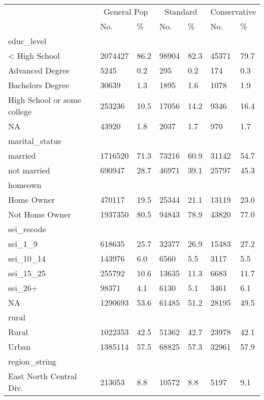 \captionsetup[table]{labelformat=empty,skip=1pt}
\begin{longtable}{lllllll}
\toprule
 & \multicolumn{2}{c}{General Pop} & \multicolumn{2}{c}{Standard} & \multicolumn{2}{c}{Conservative} \\ 
 \cmidrule(lr){2-3} \cmidrule(lr){4-5} \cmidrule(lr){6-7}
 & No. & \% & No. & \% & No. & \% \\ 
\midrule
\multicolumn{1}{l}{educ\_level} \\ 
\midrule
< High School & 2074427 & 86.2 & 98904 & 82.3 & 45371 & 79.7 \\ 
Advanced Degree & 5245 & 0.2 & 295 & 0.2 & 174 & 0.3 \\ 
Bachelors Degree & 30639 & 1.3 & 1895 & 1.6 & 1078 & 1.9 \\ 
High School or some college & 253236 & 10.5 & 17056 & 14.2 & 9346 & 16.4 \\ 
NA & 43920 & 1.8 & 2037 & 1.7 & 970 & 1.7 \\ 
\midrule
\multicolumn{1}{l}{marital\_status} \\ 
\midrule
married & 1716520 & 71.3 & 73216 & 60.9 & 31142 & 54.7 \\ 
not married & 690947 & 28.7 & 46971 & 39.1 & 25797 & 45.3 \\ 
\midrule
\multicolumn{1}{l}{homeown} \\ 
\midrule
Home Owner & 470117 & 19.5 & 25344 & 21.1 & 13119 & 23.0 \\ 
Not Home Owner & 1937350 & 80.5 & 94843 & 78.9 & 43820 & 77.0 \\ 
\midrule
\multicolumn{1}{l}{sei\_recode} \\ 
\midrule
sei\_1\_9 & 618635 & 25.7 & 32377 & 26.9 & 15483 & 27.2 \\ 
sei\_10\_14 & 143976 & 6.0 & 6560 & 5.5 & 3117 & 5.5 \\ 
sei\_15\_25 & 255792 & 10.6 & 13635 & 11.3 & 6683 & 11.7 \\ 
sei\_26+ & 98371 & 4.1 & 6130 & 5.1 & 3461 & 6.1 \\ 
NA & 1290693 & 53.6 & 61485 & 51.2 & 28195 & 49.5 \\ 
\midrule
\multicolumn{1}{l}{rural} \\ 
\midrule
Rural & 1022353 & 42.5 & 51362 & 42.7 & 23978 & 42.1 \\ 
Urban & 1385114 & 57.5 & 68825 & 57.3 & 32961 & 57.9 \\ 
\midrule
\multicolumn{1}{l}{region\_string} \\ 
\midrule
East North Central Div. & 213053 & 8.8 & 10572 & 8.8 & 5197 & 9.1 \\ 

\end{longtable}

